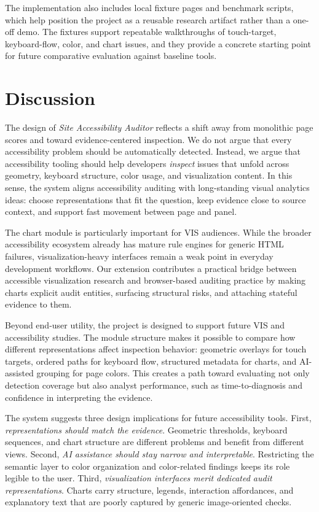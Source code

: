 The implementation also includes local fixture pages and benchmark scripts, which help position the project as a reusable research artifact rather than a one-off demo. The fixtures support repeatable walkthroughs of touch-target, keyboard-flow, color, and chart issues, and they provide a concrete starting point for future comparative evaluation against baseline tools.

\section{Discussion}
\label{sec:discussion}

The design of \textit{Site Accessibility Auditor} reflects a shift away from monolithic page scores and toward evidence-centered inspection. We do not argue that every accessibility problem should be automatically detected. Instead, we argue that accessibility tooling should help developers \emph{inspect} issues that unfold across geometry, keyboard structure, color usage, and visualization content. In this sense, the system aligns accessibility auditing with long-standing visual analytics ideas: choose representations that fit the question, keep evidence close to source context, and support fast movement between page and panel.

The chart module is particularly important for VIS audiences. While the broader accessibility ecosystem already has mature rule engines for generic HTML failures, visualization-heavy interfaces remain a weak point in everyday development workflows. Our extension contributes a practical bridge between accessible visualization research and browser-based auditing practice by making charts explicit audit entities, surfacing structural risks, and attaching stateful evidence to them.

Beyond end-user utility, the project is designed to support future VIS and accessibility studies. The module structure makes it possible to compare how different representations affect inspection behavior: geometric overlays for touch targets, ordered paths for keyboard flow, structured metadata for charts, and AI-assisted grouping for page colors. This creates a path toward evaluating not only detection coverage but also analyst performance, such as time-to-diagnosis and confidence in interpreting the evidence.

The system suggests three design implications for future accessibility tools. First, \emph{representations should match the evidence}. Geometric thresholds, keyboard sequences, and chart structure are different problems and benefit from different views. Second, \emph{AI assistance should stay narrow and interpretable}. Restricting the semantic layer to color organization and color-related findings keeps its role legible to the user. Third, \emph{visualization interfaces merit dedicated audit representations}. Charts carry structure, legends, interaction affordances, and explanatory text that are poorly captured by generic image-oriented checks.


